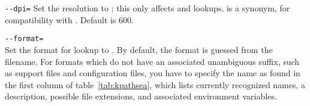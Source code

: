 \documentclass{article}
\begin{document}
\begin{ttdescription}
\item[\texttt{-{}-dpi=\var{num}}]\mbox{} 
  Set the resolution to ; this only affects 
  and  lookups.   is a synonym, for compatibility
  with .  Default is 600.

\item[\texttt{-{}-format=\var{name}}]\mbox{}\\
  Set the format for lookup to .  By default, the
  format is guessed from the filename. For formats which do not have
  an associated unambiguous suffix, such as \MP{} support files and
   configuration files, you have to specify the name as
  found in the first column of table~\ref{tab:kpathsea}, which lists
  currently recognized names, a description, possible file extensions, 
  and associated environment variables.
\end{ttdescription}
\end{document}
